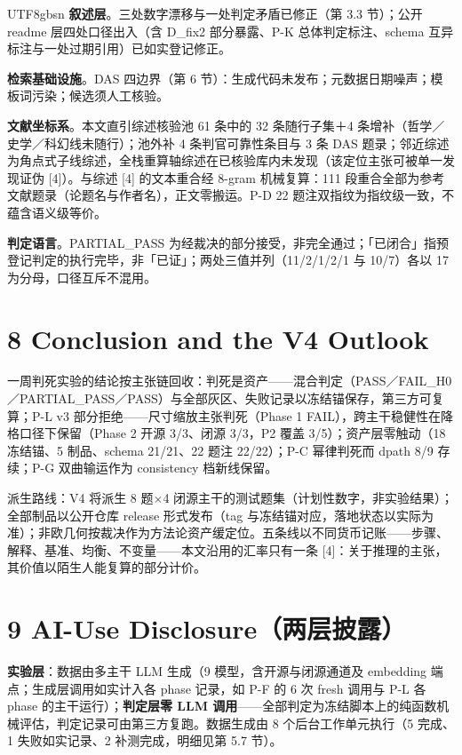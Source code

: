 \documentclass[10pt,a4paper]{article}
\begin{document}
\begin{CJK}{UTF8}{gbsn}
\textbf{叙述层}。三处数字漂移与一处判定矛盾已修正（第 3.3 节）；公开 readme 层四处口径出入（含 D\_fix2 部分暴露、P-K 总体判定标注、schema 互异标注与一处过期引用）已如实登记修正。

\textbf{检索基础设施}。DAS 四边界（第 6 节）：生成代码未发布；元数据日期噪声；模板词污染；候选须人工核验。

\textbf{文献坐标系}。本文直引综述核验池 61 条中的 32 条随行子集＋4 条增补（哲学／史学／科幻线未随行）；池外补 4 条判官可靠性条目与 3 条 DAS 题录；邻近综述为角点式子线综述，全栈重算轴综述在已核验库内未发现（该定位主张可被单一发现证伪 [4]）。与综述 [4] 的文本重合经 8-gram 机械复算：111 段重合全部为参考文献题录（论题名与作者名），正文零搬运。P-D 22 题注双指纹为指纹级一致，不蕴含语义级等价。

\textbf{判定语言}。PARTIAL\_PASS 为经裁决的部分接受，非完全通过；「已闭合」指预登记判定的执行完毕，非「已证」；两处三值并列（11/2/1/2/1 与 10/7）各以 17 为分母，口径互斥不混用。


\section*{8 Conclusion and the V4 Outlook}一周判死实验的结论按主张链回收：判死是资产——混合判定（PASS／FAIL\_H0／PARTIAL\_PASS／PASS）与全部灰区、失败记录以冻结锚保存，第三方可复算；P-L v3 部分拒绝——尺寸缩放主张判死（Phase 1 FAIL），跨主干稳健性在降格口径下保留（Phase 2 开源 3/3、闭源 3/3，P2 覆盖 3/5）；资产层零触动（18 冻结锚、5 制品、schema 21/21、22 题注 22/22）；P-C 幂律判死而 dpath 8/9 存续；P-G 双曲输运作为 consistency 档新线保留。

派生路线：V4 将派生 8 题×4 闭源主干的测试题集（计划性数字，非实验结果）；全部制品以公开仓库 release 形式发布（tag 与冻结锚对应，落地状态以实际为准）；非欧几何按裁决作为方法论资产缓定位。五条线以不同货币记账——步骤、解释、基准、均衡、不变量——本文沿用的汇率只有一条 [4]：关于推理的主张，其价值以陌生人能复算的部分计价。


\section*{9 AI-Use Disclosure（两层披露）}\textbf{实验层}：数据由多主干 LLM 生成（9 模型，含开源与闭源通道及 embedding 端点；生成层调用如实计入各 phase 记录，如 P-F 的 6 次 fresh 调用与 P-L 各 phase 的主干运行）；\textbf{判定层零 LLM 调用}——全部判定为冻结脚本上的纯函数机械评估，判定记录可由第三方复跑。数据生成由 8 个后台工作单元执行（5 完成、1 失败如实记录、2 补测完成，明细见第 5.7 节）。


\end{CJK}
\end{document}
